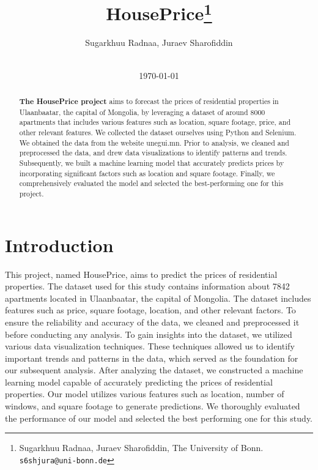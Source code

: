 \documentclass[11pt, a4paper, leqno]{article}
\begin{document}
\title{HousePrice\thanks{Sugarkhuu Radnaa, Juraev Sharofiddin, The University of Bonn. \texttt{s6shjura@uni-bonn.de}}}

\author{Sugarkhuu Radnaa, Juraev Sharofiddin}

\date{
    \\[1ex]
    \today
}

\maketitle


\begin{abstract}
    \textbf{The HousePrice project} aims to forecast the prices of residential properties in Ulaanbaatar,
    the capital of Mongolia, by leveraging a dataset of around 8000 apartments that includes various features such as location,
    square footage, price, and other relevant features. We collected the dataset ourselves using
    Python and Selenium. We obtained the data from the website unegui.mn.
    Prior to analysis, we cleaned and preprocessed the data, and drew data visualizations
    to identify patterns and trends. Subsequently, we built a machine learning model that accurately predicts
    prices by incorporating significant factors such as location and square footage.
    Finally, we comprehensively evaluated the model and selected the best-performing one for this project.
\end{abstract}

\clearpage


\section{Introduction} %
\label{sec:introduction}

This project, named HousePrice, aims to predict the prices of residential properties.
The dataset used for this study contains information about 7842 apartments located in Ulaanbaatar, the capital of Mongolia.
The dataset includes features such as price, square footage, location, and other relevant factors.
To ensure the reliability and accuracy of the data, we cleaned and preprocessed it before conducting any analysis.
To gain insights into the dataset, we utilized various data visualization techniques.
These techniques allowed us to identify important trends and patterns in the data, which served as the foundation for our subsequent analysis.
After analyzing the dataset, we constructed a machine learning model capable of accurately predicting the prices of residential properties.
Our model utilizes various features such as location, number of windows, and square footage to generate predictions.
We thoroughly evaluated the performance of our model and selected the best performing one for this study.
\end{document}

